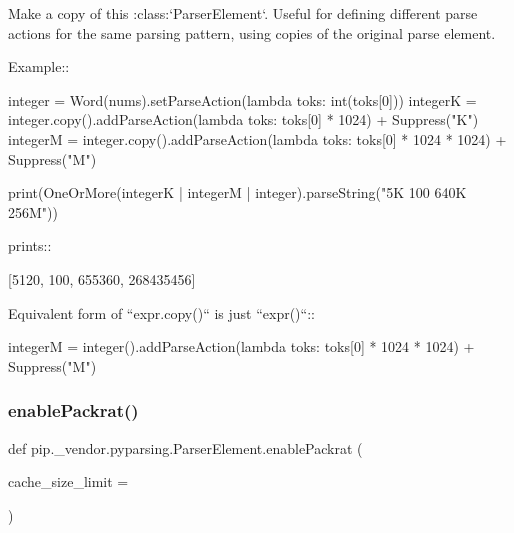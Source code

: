 \begin{DoxyVerb}Make a copy of this :class:`ParserElement`.  Useful for defining
different parse actions for the same parsing pattern, using copies of
the original parse element.

Example::

    integer = Word(nums).setParseAction(lambda toks: int(toks[0]))
    integerK = integer.copy().addParseAction(lambda toks: toks[0] * 1024) + Suppress("K")
    integerM = integer.copy().addParseAction(lambda toks: toks[0] * 1024 * 1024) + Suppress("M")

    print(OneOrMore(integerK | integerM | integer).parseString("5K 100 640K 256M"))

prints::

    [5120, 100, 655360, 268435456]

Equivalent form of ``expr.copy()`` is just ``expr()``::

    integerM = integer().addParseAction(lambda toks: toks[0] * 1024 * 1024) + Suppress("M")
\end{DoxyVerb}
 \mbox{\label{classpip_1_1__vendor_1_1pyparsing_1_1ParserElement_aecf2e7774e67bd46c7ac4caa0152ebf7}} 
\subsubsection{\texorpdfstring{enable\+Packrat()}{enablePackrat()}}
{\footnotesize\ttfamily def pip.\+\_\+vendor.\+pyparsing.\+Parser\+Element.\+enable\+Packrat (\begin{DoxyParamCaption}\item[{}]{cache\+\_\+size\+\_\+limit = {} }\end{DoxyParamCaption})\hspace{0.3cm}{\ttfamily [static]}}

